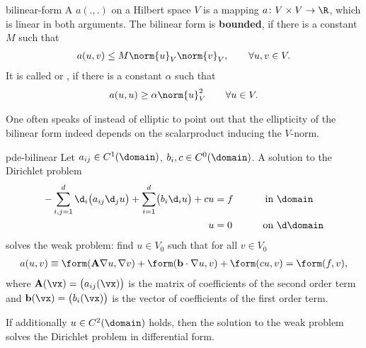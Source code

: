 \begin{Definition}{bilinear-form}
  A  $a(.,.)$ on a Hilbert space $V$ is a
  mapping $a\colon V\times V \to \R$, which is linear in both
  arguments. The bilinear form is \textbf{bounded}, if there is a
  constant $M$ such that
  \begin{gather}
    a(u,v) \le M \norm{u}_V \norm{v}_V, \qquad \forall u,v\in V.
  \end{gather}
  It is called  or , if there is a
  constant $\alpha$ such that
  \begin{gather}
    a(u,u) \ge \alpha \norm{u}_V^2 \qquad\forall u\in V.
  \end{gather}
\end{Definition}

\begin{notation}
  One often speaks of  instead of elliptic to
  point out that the ellipticity of the bilinear form indeed depends
  on the scalarproduct inducing the $V$-norm.
\end{notation}

\begin{Lemma}{pde-bilinear}
  Let $a_{ij} \in C^1(\domain)$, $b_i, c\in C^0(\domain)$. A solution
  to the Dirichlet problem
  \begin{gather}
    \label{eq:hilbert:div-eq}
    \begin{aligned}
      -\sum_{i,j=1}^d \d_i \bigl(a_{ij} \d_j u\bigr)
      + \sum_{i=1}^d \bigl(b_i \d_i u\bigr) + c u &= f
      & \qquad\text{in }&\domain\\
      u &= 0
      & \qquad\text{on }&\d\domain
    \end{aligned}
  \end{gather}
  solves the weak problem: find $u\in V_0$ such that for all
  $v\in V_0$
  \begin{gather}
    \label{eq:hilbert:weak}
    a(u,v) \equiv \form(\mathbf A \nabla u,\nabla v)
    + \form(\mathbf b\cdot\nabla u,v)
    +\form(cu,v) = \form(f,v),
  \end{gather}
  where $\mathbf A(\vx) = \bigl(a_{ij}(\vx)\bigr)$ is the matrix of
  coefficients of the second order term and
  $\mathbf b(\vx) = \bigl(b_{i}(\vx)\bigr)$ is the vector of
  coefficients of the first order term.

  If additionally $u\in C^2(\domain)$ holds, then the solution to the
  weak problem solves the Dirichlet problem in differential form.
\end{Lemma}

